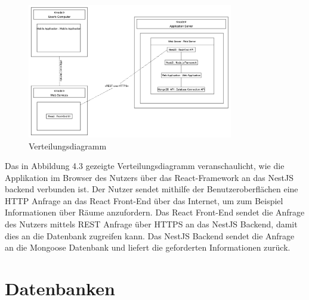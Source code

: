 \begin{figure}[!h]
    \centering
    \includegraphics[width=0.8\textwidth]{./UML_Diagrams/Verteilungsdiagramm.png}
    \caption{Verteilungsdiagramm}
    \label{fig:Verteilungsdiagramm}
\end{figure}

Das in Abbildung 4.3 gezeigte Verteilungsdiagramm veranschaulicht, wie die Applikation im Browser des Nutzers über das React-Framework an das NestJS backend verbunden ist.
Der Nutzer sendet mithilfe der Benutzeroberflächen eine HTTP Anfrage an das React Front-End über das Internet, um zum Beispiel Informationen über Räume anzufordern.
Das React Front-End sendet die Anfrage des Nutzers mittels REST Anfrage über HTTPS an das NestJS Backend, damit dies an die Datenbank zugreifen kann.
Das NestJS Backend sendet die Anfrage an die Mongoose Datenbank und liefert die geforderten Informationen zurück.


\section{Datenbanken}
